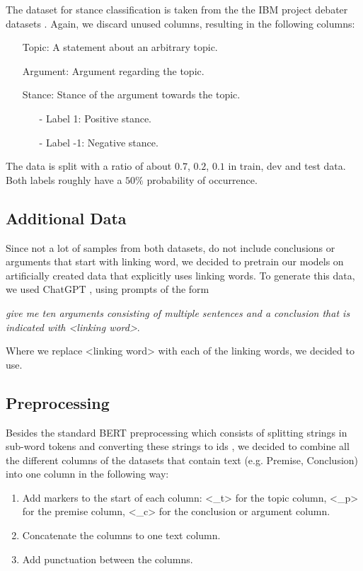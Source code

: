 The dataset for stance classification is taken from the the IBM project debater datasets \cite{stancedata, ibm}. Again, we discard unused columns, resulting in the following columns:
\begin{enumerate}
	\item[\textbullet] Topic: A statement about an arbitrary topic.
	\item[\textbullet] Argument: Argument regarding the topic.
	\item[\textbullet] Stance: Stance of the argument towards the topic.
	\begin{enumerate}
		\item[-] Label 1: Positive stance.
		\item[-] Label -1: Negative stance.
	\end{enumerate}
\end{enumerate}
The data is split with a ratio of about $0.7$, $0.2$, $0.1$ in train, dev and test data. Both labels roughly have a $50\%$ probability of occurrence.

\subsection{Additional Data}

Since not a lot of samples from both datasets, do not include conclusions or arguments that start with linking word, we decided to pretrain our models on artificially created data that explicitly uses linking words. To generate this data, we used ChatGPT \cite{chatgpt}, using prompts of the form
\begin{center}
	\textit{give me ten arguments consisting of multiple sentences and a conclusion that is indicated with <linking word>}.
\end{center}

Where we replace <linking word> with each of the linking words, we decided to use. 

\subsection{Preprocessing}

Besides the standard BERT preprocessing which consists of splitting strings in sub-word tokens and converting these strings to ids \cite{bertprepro}, we decided to combine all the different columns of the datasets that contain text (e.g. Premise, Conclusion) into one column in the following way:
\begin{enumerate}
	\item Add markers to the start of each column: <\_t> for the topic column, <\_p> for the premise column, <\_c> for the conclusion or argument column.
	\item Concatenate the columns to one text column.
	\item Add punctuation between the columns.
\end{enumerate}

